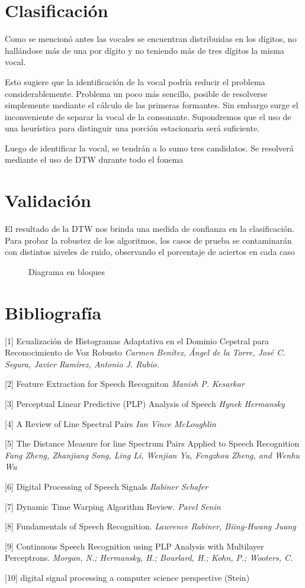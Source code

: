 \documentclass[a4paper]{article}
\begin{document}
	\section{Clasificación}
		Como se mencionó antes las vocales se encuentran
		distribuidas en los dígitos, no hallándose más de
		una por dígito y no teniendo más de tres dígitos la
		misma vocal.

		Esto sugiere que la identificación de la vocal podría
		reducir el problema considerablemente.	Problema un poco
		más sencillo, posible de resolverse simplemente mediante
		el cálculo de las primeras formantes.	Sin embargo surge
		el inconveniente de separar la vocal de la consonante.
		Supondremos que el uso de una heurística para distinguir
		una porción estacionaria será suficiente.

		Luego de identificar la vocal, se tendrán a lo sumo
		tres candidatos.  Se resolverá mediante el uso de DTW
		durante todo el fonema

	\section{Validación}
		El resultado de la DTW nos brinda una medida de confianza
		en la clasificación.  Para probar la robustez de los
		algoritmos, los casos de prueba se contaminarán con
		distintos niveles de ruido, observando el porcentaje de
		aciertos en cada caso


\newpage
		\begin{figure}
			\fbox{
				
			}
			\caption{Diagrama en bloques}
		\end{figure}
	\section{Bibliografía}
		[1] Ecualización de Histogramas Adaptativa en
		el Dominio Cepstral para Reconocimiento de Voz Robusto
		\emph{Carmen Benítez, Ángel de la Torre, José C. Segura, Javier Ramírez, Antonio J. Rubio.}


		[2] Feature Extraction for Speech Recogniton
		\emph{Manish P. Kesarkar}


		[3] Perceptual Linear Predictive (PLP) Analysis of Speech
		\emph{Hynek Hermansky}


		[4] A Review of Line Spectral Pairs
		\emph{Ian Vince McLoughlin}


		[5] The Distance Measure for line Spectrum Pairs
		Applied to Speech Recognition
		\emph{Fang Zheng, Zhanjiang Song, Ling Li, Wenjian Yu, Fengzhou Zheng, and Wenhu Wu}


		[6] Digital Processing of Speech Signals
		\emph{Rabiner Schafer}


		[7] Dynamic Time Warping Algorithm Review.
		\emph{Pavel Senin}


		[8] Fundamentals of Speech Recognition.
		\emph{Lawrence Rabiner, Biing-Hwang Juang}

		[9] Continuous Speech Recognition using PLP Analysis with Multilayer Perceptrons.
		\emph{Morgan, N.; Hermansky, H.; Bourlard, H.; Kohn, P.; Wooters, C.}

		[10]  digital signal processing a computer science perspective (Stein)
		
	
\end{document}
